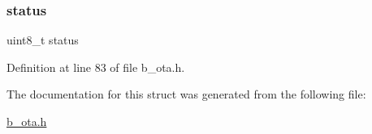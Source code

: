\subsubsection{\texorpdfstring{status}{status}}
{\footnotesize\ttfamily uint8\+\_\+t status}



Definition at line 83 of file b\+\_\+ota.\+h.



The documentation for this struct was generated from the following file\+:\begin{DoxyCompactItemize}
\item 
\mbox{\hyperlink{b__ota_8h}{b\+\_\+ota.\+h}}\end{DoxyCompactItemize}
